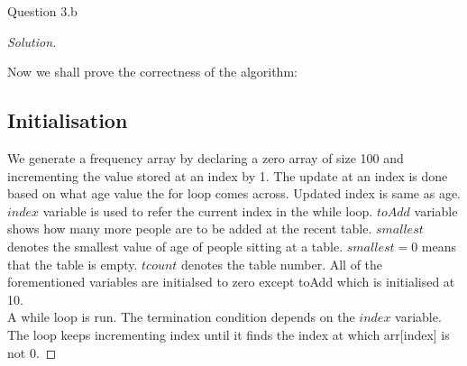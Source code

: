 \begin{solution}{Question 3.b}
\begin{proof}[Solution]
\begin{algorithm}[H]
\begin{algorithmic}[1]
                     
                    \Else{}
                    \EndIf{}
                \EndWhile{}
                 
                \EndIf{}
                 
                \EndProcedure{}
            \end{algorithmic}
        \end{algorithm}
        
        Now we shall prove the correctness of the algorithm:
        \subsection*{Initialisation}
        We generate a frequency array by declaring a zero array of size 100 and incrementing the value stored at an index by 1. The update at an index is done based on what age value the for loop comes across. Updated index is same as age. \\
        $index$ variable is used to refer the current index in the while loop.
        $toAdd$ variable shows how many more people are to be added at the recent table.
        $smallest$ denotes the smallest value of age of people sitting at a table. $smallest=0$ means that the table is empty.
        $tcount$ denotes the table number.
        All of the forementioned variables are initialsed to zero except toAdd which is initialised at 10.\\
        A while loop is run. The termination condition depends on the $index$ variable.
        The loop keeps incrementing index until it finds the index at which arr[index] is not 0.

\end{proof}
\end{solution}
